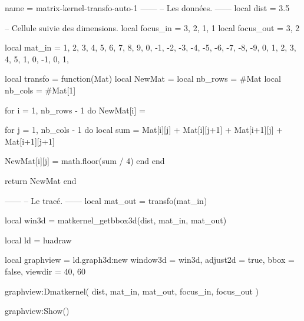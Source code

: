 \documentclass[border = 3pt]{standalone}
\begin{document}
\begin{luadraw*}{name = matrix-kernel-transfo-auto-1}
------
-- Les données.
------
local dist = 3.5

-- Cellule suivie des dimensions.
local focus_in  = { {3, 2}, {1, 1} }
local focus_out = {3, 2}

local mat_in = {
  { 1,  2,  3,  4,  5},
  { 6,  7,  8,  9,  0},
  {-1, -2, -3, -4, -5},
  {-6, -7, -8, -9,  0},
  { 1,  2,  3,  4,  5},
  { 1,  0, -1,  0,  1},
}

local transfo = function(Mat)
  local NewMat  = {}
  local nb_rows = #Mat
  local nb_cols = #Mat[1]

  for i = 1, nb_rows - 1 do
    NewMat[i] = {}

    for j = 1, nb_cols - 1 do
      local sum = Mat[i][j] + Mat[i][j+1] + Mat[i+1][j] + Mat[i+1][j+1]

      NewMat[i][j] = math.floor(sum / 4)
    end
  end

  return NewMat
end

------
-- Le tracé.
------
local mat_out = transfo(mat_in)

local win3d = matkernel_getbbox3d(dist, mat_in, mat_out)

local ld = luadraw

local graphview = ld.graph3d:new{
  window3d = win3d,
  adjust2d = true,
  bbox     = false,
  viewdir  = {40, 60}
}

graphview:Dmatkernel(
  dist,
  mat_in, mat_out,
  focus_in, focus_out
)

graphview:Show()
\end{luadraw*}
\end{document}
